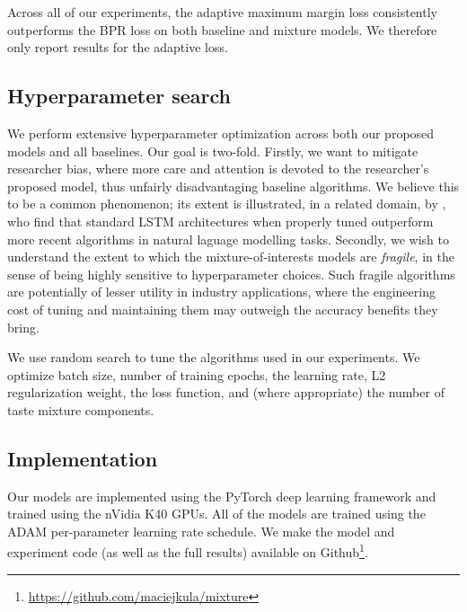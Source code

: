 \documentclass[sigconf]{acmart}
\begin{document}
Across all of our experiments, the adaptive maximum margin loss consistently outperforms the BPR loss on both baseline and mixture models. We therefore only report results for the adaptive loss.

\subsection{Hyperparameter search}

We perform extensive hyperparameter optimization across both our proposed models and all baselines. Our goal is two-fold. Firstly, we want to mitigate researcher bias, where more care and attention is devoted to the researcher's proposed model, thus unfairly disadvantaging baseline algorithms. We believe this to be a common phenomenon; its extent is illustrated, in a related domain, by \cite{melis2017state}, who find that standard LSTM architectures when properly tuned outperform more recent algorithms in natural laguage modelling tasks. Secondly, we wish to understand the extent to which the mixture-of-interests models are \emph{fragile}, in the sense of being highly sensitive to hyperparameter choices. Such fragile algorithms are potentially of lesser utility in industry applications, where the engineering cost of tuning and maintaining them may outweigh the accuracy benefits they bring.

We use random search to tune the algorithms used in our experiments. We optimize batch size, number of training epochs, the learning rate, L2 regularization weight, the loss function, and (where appropriate) the number of taste mixture components.

\subsection{Implementation}
Our models are implemented using the PyTorch deep learning framework \citep{paszke2017pytorch} and trained using the nVidia K40 GPUs. All of the models are trained using the ADAM \citep{kingma2014adam} per-parameter learning rate schedule. We make the model and experiment code (as well as the full results) available on Github\footnote{\url{https://github.com/maciejkula/mixture}}.
\end{document}
